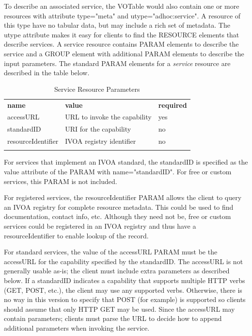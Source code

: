 \documentclass[11pt,a4paper]{ivoa}
\begin{document}
To describe an associated service, the VOTable would also
contain one or more resources with attribute type="meta" and
utype="adhoc:service". A resource of this type have no tabular data,
but may include a rich set of metadata. The utype attribute makes it
easy for clients to find the RESOURCE elements that describe services.
A service resource contains PARAM elements to describe the service and
a GROUP element with additional PARAM elements to describe the input
parameters.
The standard PARAM elements for a {\em service\/} resource
are described in the table below.
\begin{table}[h]
\begin{center}
\begin{tabular}{|l|l|l|}
\sptablerule
{\bf name}  &  {\bf value}  & {\bf required}  \\
\sptablerule
accessURL           &  URL to invoke the capability  &  yes  \\
standardID          &  URI for the capability        &  no   \\
resourceIdentifier  & IVOA registry identifier       &  no   \\
\sptablerule
\end{tabular}
\end{center}
\caption{Service Resource Parameters}
\end{table}

For services that implement an IVOA standard, the standardID is specified
as the value attribute of the PARAM with name="standardID".
For free or custom services, this PARAM is not included.

For registered services, the resourceIdentifier PARAM allows the client
to query an IVOA registry for complete resource metadata. This could be
used to find documentation, contact info, etc. Although they need not be,
free or custom services could be registered in an IVOA registry and thus
have a resourceIdentifier to enable lookup of the record.

For standard services, the value of the accessURL PARAM must be the
accessURL for the capability specified by the standardID. The accessURL
is not generally usable as-is; the client must include extra parameters
as described below. If a standardID indicates a capability that supports
multiple HTTP verbs (GET, POST, etc.), the client may use any supported
verbs. Otherwise, there is no way in this version to specify that POST
(for example) is supported so clients should assume that only HTTP GET
may be used. Since the accessURL may contain parameters; clients must
parse the URL to decide how to append additional parameters when
invoking the service.
\end{document}
